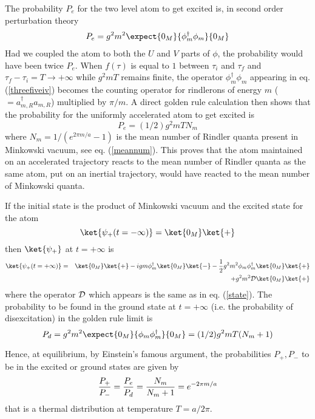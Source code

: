 \documentclass[12pt]{article}
\begin{document}
The probability $P_e$ for the two level atom to get excited is, in second
order perturbation theory
  \begin{eqnarray}
P_e =
g^2 m^2 \expect{0_M}{\phi_m^\dagger  \phi_m}{0_M} \label{threefiveiv}
\end{eqnarray}
Had we coupled the atom to both the $U$ and $V$ parts of $\phi$, the
probability would have been twice $P_e$.
When $f(\tau)$ is equal to $1$ between $\tau_i$ and $\tau_f$
and $\tau_f - \tau_i = T \rightarrow +\infty$ while $g^2 m T$ remains finite,
the operator $\phi_m^\dagger  \phi_m
$ appearing in eq. (\ref{threefiveiv}) becomes the counting operator for
rindlerons of energy $m$ ($= a_{m,R}^\dagger  a_{m,R}$) multiplied by
$\pi/ m$. A direct golden rule calculation
then shows that the probability for the
uniformly accelerated atom to get excited is
\cite{Unruh} \begin{equation} P_{e} =
(1/2)
g^2 m
T N_m \label{threefivexiii}
\end{equation}
where $N_m = 1/ (e^{2 \pi m/a} -1)$ is
the mean number of Rindler quanta present in Minkowski vacuum, see
eq. (\ref{meannum}). This proves that the atom maintained on an
accelerated trajectory  reacts to
the mean number of Rindler quanta as
the same atom, put on an inertial
trajectory, would have reacted to the mean number of Minkowski quanta.


If the initial state is the product of Minkowski vacuum and the excited state
for the atom
\begin{equation}\ket{\psi_+(t=-\infty)}= \ket{0_M}\ket{+}
\end{equation}
then $\ket{\psi_+}$ at $t=+\infty$ is
\begin{eqnarray}
\ket{\psi_+(t=+\infty)} &=& \ket{0_M} \ket{+}
-ig m \phi_m^\dagger \ket{0_M}\ket{-}-  {1\over 2} g^2
m^2  \phi_m \phi_m^\dagger \ket{0_M}\ket{+}
\nonumber\\
& &+  g^2 m^2
{\cal D}  \ket{0_M}\ket{+}
\label{state+}
\end{eqnarray}
where the operator ${\cal D}$ which appears is the same as
in eq. (\ref{state}).
The probability to be found in the ground state at $t=+\infty$ (i.e.
the probability of disexcitation) in the golden
rule limit is
\begin{equation} P_{d} = g^2 m^2 \expect{0_M}{\phi_m \phi_m^\dagger}{0_M}
= (1/2) g^2 m
T ( N_m + 1) \label{threefivexiiid}
\end{equation}

Hence, at equilibrium, by Einstein's famous argument,
 the probabilities $P_+, P_-$ to be in the excited or
ground states are given by
\begin{equation}
{P_+ \over P_-}={P_e\over P_d}={N_m\over N_m + 1} = e^{-2 \pi m / a}
\label{P/P}
\end{equation}
that is a thermal distribution at temperature $T= a/ 2\pi$.
\end{document}
